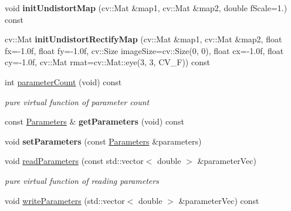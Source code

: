 \begin{DoxyCompactItemize}
void {\bfseries init\+Undistort\+Map} (cv\+::\+Mat \&map1, cv\+::\+Mat \&map2, double f\+Scale=1.) const
\item 
\mbox{\label{classcamodocal_1_1CataCamera_a6abe3cbd2aed5ac4ae55aab16b12b3df}} 
cv\+::\+Mat {\bfseries init\+Undistort\+Rectify\+Map} (cv\+::\+Mat \&map1, cv\+::\+Mat \&map2, float fx=-\/1.\+0f, float fy=-\/1.\+0f, cv\+::\+Size image\+Size=cv\+::\+Size(0, 0), float cx=-\/1.\+0f, float cy=-\/1.\+0f, cv\+::\+Mat rmat=cv\+::\+Mat\+::eye(3, 3, C\+V\+\_\+F)) const
\item 
\mbox{\label{classcamodocal_1_1CataCamera_a144359c9ce8f66639beeb95f3dda0822}} 
int \hyperlink{classcamodocal_1_1CataCamera_a144359c9ce8f66639beeb95f3dda0822}{parameter\+Count} (void) const
\begin{DoxyCompactList}\small\item\em pure virtual function of parameter count \end{DoxyCompactList}\item 
\mbox{\label{classcamodocal_1_1CataCamera_a59a3f33f2ba25ca6c774d55225a0d83f}} 
const \hyperlink{classcamodocal_1_1CataCamera_1_1Parameters}{Parameters} \& {\bfseries get\+Parameters} (void) const
\item 
\mbox{\label{classcamodocal_1_1CataCamera_ace8b0e5a4860516f4d78b2380b996da3}} 
void {\bfseries set\+Parameters} (const \hyperlink{classcamodocal_1_1CataCamera_1_1Parameters}{Parameters} \&parameters)
\item 
\mbox{\label{classcamodocal_1_1CataCamera_ad2a147b0fce61b1ddb79c4a4cbd2e00e}} 
void \hyperlink{classcamodocal_1_1CataCamera_ad2a147b0fce61b1ddb79c4a4cbd2e00e}{read\+Parameters} (const std\+::vector$<$ double $>$ \&parameter\+Vec)
\begin{DoxyCompactList}\small\item\em pure virtual function of reading parameters \end{DoxyCompactList}\item 
\mbox{\label{classcamodocal_1_1CataCamera_a29622f8eb5dd441e790c245d435a3287}} 
void \hyperlink{classcamodocal_1_1CataCamera_a29622f8eb5dd441e790c245d435a3287}{write\+Parameters} (std\+::vector$<$ double $>$ \&parameter\+Vec) const

\end{DoxyCompactItemize}
